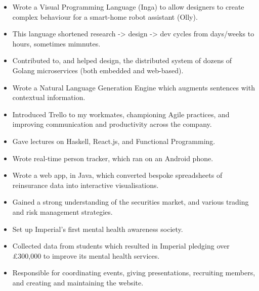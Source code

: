 \documentclass{jcgcv}
\begin{document}
\begin{column}
\begin{itemize}
  \item Wrote a Visual Programming Language (Inga) to allow designers to
        create complex behaviour for a smart-home robot assistant (Olly).
  \item This language shortened research -> design -> dev cycles from 
        days/weeks to hours, sometimes mimnutes.
  \item Contributed to, and helped design, the distributed system of dozens
        of Golang microservices (both embedded and web-based).
  \item Wrote a Natural Language Generation Engine which augments sentences
        with contextual information.
  \item Introduced Trello to my workmates, championing Agile practices,
        and improving communication and productivity across the company.
  \item Gave lectures on Haskell, React.js, and Functional Programming.
\end{itemize}

\begin{itemize}
  \item Wrote real-time person tracker, which ran on an Android phone.
\end{itemize}

\begin{itemize}
  \item Wrote a web app, in Java, which converted bespoke spreadsheets of
        reinsurance data into interactive visualisations.
  \item Gained a strong understanding of the securities market, and various
        trading and risk management strategies.
\end{itemize}

\begin{itemize}
  \item Set up Imperial's first mental health awareness society.
  \item Collected data from students which resulted in Imperial pledging
        over \pounds300,000 to improve its mental health services.
  \item Responsible for coordinating events, giving presentations, recruiting
        members, and creating and maintaining the website.
\end{itemize}


\end{column}
\end{document}
